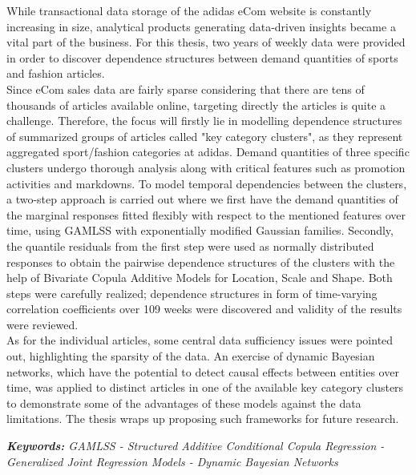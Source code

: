 

\vspace{2cm}


While transactional data storage of the adidas eCom website is constantly increasing in size, analytical products generating data-driven insights became a vital part of the business. For this thesis, two years of weekly data were provided in order to discover dependence structures between demand quantities of sports and fashion articles.
\\

Since eCom sales data are fairly sparse considering that there are tens of thousands of articles available online, targeting directly the articles is quite a challenge. Therefore, the focus will firstly lie in modelling dependence structures of summarized groups of articles called "key category clusters", as they represent aggregated sport/fashion categories at adidas. Demand quantities of three specific clusters undergo thorough analysis along with critical features such as promotion activities and markdowns. To model temporal dependencies between the clusters, a two-step approach is carried out where we first have the demand quantities of the marginal responses fitted flexibly with respect to the mentioned features over time, using GAMLSS with exponentially modified Gaussian families. Secondly, the quantile residuals from the first step were used as normally distributed responses to obtain the pairwise dependence structures of the clusters with the help of Bivariate Copula Additive Models for Location, Scale and Shape. Both steps were carefully realized; dependence structures in form of time-varying correlation coefficients over 109 weeks were discovered and validity of the results were reviewed.
\\

As for the individual articles, some central data sufficiency issues were pointed out, highlighting the sparsity of the data. An exercise of dynamic Bayesian networks, which have the potential to detect causal effects between entities over time, was applied to distinct articles in one of the available key category clusters to demonstrate some of the advantages of these models against the data limitations. The thesis wraps up proposing such frameworks for future research.


\vspace{1cm}

\textit{\textbf{Keywords:} GAMLSS - Structured Additive Conditional Copula Regression - Generalized Joint Regression Models - Dynamic Bayesian Networks}


